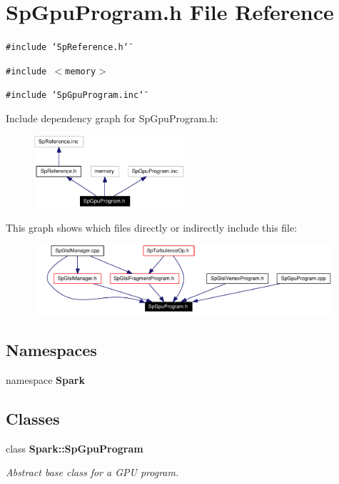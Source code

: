 \section{Sp\-Gpu\-Program.h File Reference}
\label{SpGpuProgram_8h}
{\tt \#include \char`\"{}Sp\-Reference.h\char`\"{}}\par
{\tt \#include $<$memory$>$}\par
{\tt \#include \char`\"{}Sp\-Gpu\-Program.inc\char`\"{}}\par


Include dependency graph for Sp\-Gpu\-Program.h:\begin{figure}[H]
\begin{center}
\leavevmode
\includegraphics[width=157pt]{SpGpuProgram_8h__incl}
\end{center}
\end{figure}


This graph shows which files directly or indirectly include this file:\begin{figure}[H]
\begin{center}
\leavevmode
\includegraphics[width=312pt]{SpGpuProgram_8h__dep__incl}
\end{center}
\end{figure}
\subsection*{Namespaces}
\begin{CompactItemize}
\item 
namespace {\bf Spark}
\end{CompactItemize}
\subsection*{Classes}
\begin{CompactItemize}
\item 
class {\bf Spark::Sp\-Gpu\-Program}
\begin{CompactList}\small\item\em Abstract base class for a GPU program. \item\end{CompactList}\end{CompactItemize}
